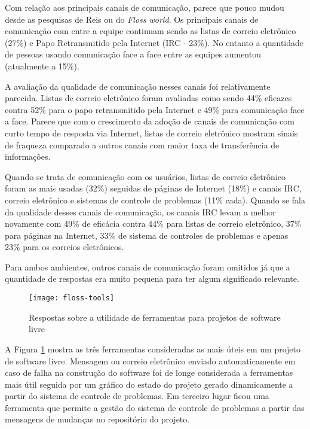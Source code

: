 Com relação aos principais canais de comunicação, parece que pouco
mudou desde as pesquisas de Reis ou do \textit{Floss world}. Os
principais canais de comunicação com entre a equipe continuam sendo as
listas de correio eletrônico (27\%) e Papo Retransmitido pela Internet
(IRC - 23\%). No entanto a quantidade de pessoas usando comunicação
face a face entre as equipes aumentou (atualmente a 15\%).

A avaliação da qualidade de comunicação nesses canais foi
relativamente parecida. Listas de correio eletrônico foram avaliadas
como sendo 44\% eficazes contra 52\% para o papo retransmitido pela
Internet e 49\% para comunicação face a face. Parece que com o
crescimento da adoção de canais de comunicação com curto tempo de
resposta via Internet, listas de correio eletrônico mostram sinais de
fraqueza comparado a outros canais com maior taxa de transferência de
informações.

Quando se trata de comunicação com os usuários, listas de correio
eletrônico foram as mais usadas (32\%) seguidas de páginas de Internet
(18\%) e canais IRC, correio eletrônico e sistemas de controle de
problemas (11\% cada). Quando se fala da qualidade desses canais de
comunicação, os canais IRC levam a melhor novamente com 49\% de
eficácia contra 44\% para listas de correio eletrônico, 37\% para
páginas na Internet, 33\% de sistema de controles de problemas e
apenas 23\% para os correios eletrônicos.

Para ambos ambientes, outros canais de comunicação foram omitidos já
que a quantidade de respostas era muito pequena para ter algum
significado relevante.

\begin{figure}
  \centering
  \texttt{[image: floss-tools]}
  \caption{Respostas sobre a utilidade de ferramentas para projetos de
    software livre}
  \label{fig:floss-tools}
\end{figure}

A Figura \ref{fig:floss-tools} mostra as três ferramentas consideradas
as mais úteis em um projeto de software livre. Mensagem ou correio
eletrônico enviado automaticamente em caso de falha na construção do
software foi de longe considerada a ferramentas mais útil seguida por
um gráfico do estado do projeto gerado dinamicamente a partir do
sistema de controle de problemas. Em terceiro lugar ficou uma
ferramenta que permite a gestão do sistema de controle de problemas a
partir das mensagens de mudanças no repositório do projeto.

